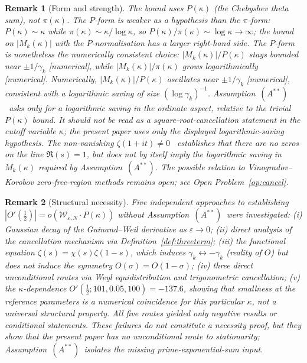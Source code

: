 \documentclass[11pt]{article}
\newtheorem*{remark}{Remark}
\newcommand{\Wgamma}{\mathcal{W}_{\varepsilon,N}}   %
\newcommand{\Astar}{\ensuremath{(A^{**})}}  %
\begin{document}
\begin{remark}[Form and strength]
\label{rem:strength}
The bound uses $P(\kappa)$ (the Chebyshev theta sum),
not $\pi(\kappa)$.
The $P$-form is \emph{weaker} as a hypothesis than the $\pi$-form:
$P(\kappa)\sim\kappa$ while $\pi(\kappa)\sim\kappa/\log\kappa$,
so $P(\kappa)/\pi(\kappa)\sim\log\kappa\to\infty$;
the bound on $|M_k(\kappa)|$ with the $P$-normalisation has a larger right-hand side.
The $P$-form is nonetheless the numerically consistent choice:
$|M_k(\kappa)|/P(\kappa)$ stays bounded near $\pm 1/\gamma_k$
[numerical], while $|M_k(\kappa)|/\pi(\kappa)$ grows logarithmically [numerical].
Numerically, $|M_k(\kappa)|/P(\kappa)$ oscillates near $\pm 1/\gamma_k$
[numerical], consistent with a logarithmic saving of size $(\log\gamma_k)^{-1}$.
Assumption~\Astar\ asks only for a logarithmic saving in the
ordinate aspect, relative to the trivial $P(\kappa)$ bound.
It should not be read as a square-root-cancellation statement
in the cutoff variable $\kappa$; the present paper uses only the
displayed logarithmic-saving hypothesis.
The non-vanishing $\zeta(1+it)\ne 0$~\cite{Hadamard,dlVP} establishes
that there are no zeros on the line $\Re(s)=1$, but does not by itself
imply the logarithmic saving in $M_k(\kappa)$ required by
Assumption~\Astar.
The possible relation to Vinogradov--Korobov zero-free-region methods
\cite{MossinghoffTrudgianYang24,Bellotti24a}
remains open; see Open Problem~\ref{op:cancel}.
\end{remark}

\begin{remark}[Structural necessity]
\label{rem:necessity}
Five independent approaches to establishing
$|O'(\tfrac12)|=o(\Wgamma\cdot P(\kappa))$ without
Assumption~\Astar\ were investigated:
(i) Gaussian decay of the Guinand--Weil derivative as $\varepsilon\to 0$;
(ii) direct analysis of the cancellation mechanism via
     Definition~\ref{def:threeterm};
(iii) the functional equation $\zeta(s)=\chi(s)\zeta(1-s)$, which
     induces $\gamma_k\leftrightarrow-\gamma_k$ (reality of $O$) but does
     not induce the symmetry $O(\sigma)=O(1-\sigma)$;
(iv) three direct unconditional routes via Weyl equidistribution and
     trigonometric cancellation;
(v) the $\kappa$-dependence $O'(\tfrac12;101,0.05,100)=-137.6$, showing
     that smallness at the reference parameters is a numerical coincidence
     for this particular $\kappa$, not a universal structural property.
All five routes yielded only negative results or conditional statements.
These failures do not constitute a necessity proof, but they show that
the present paper has no unconditional route to stationarity;
Assumption~\Astar\ isolates the missing prime-exponential-sum input.
\end{remark}
\end{document}
